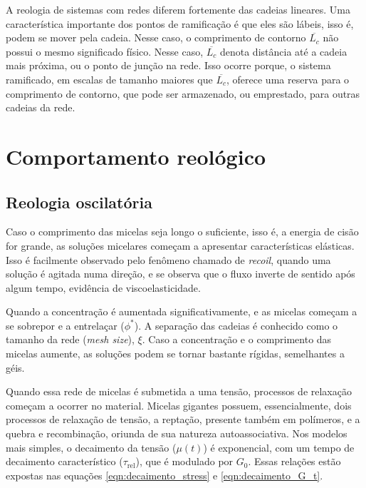 		A reologia de sistemas com redes diferem fortemente das cadeias lineares. %
		Uma característica importante dos pontos de ramificação é que eles são lábeis, isso é, podem se mover pela cadeia. Nesse caso, o comprimento de contorno \(\overline{L_c}\) não possui o mesmo significado físico. Nesse caso, \(\overline{L_c}\) denota distância até a cadeia mais próxima, ou o ponto de junção na rede. Isso ocorre porque, o sistema ramificado, em escalas de tamanho maiores que \(\overline{L_c}\), oferece uma reserva para o comprimento de contorno, que pode ser armazenado, ou emprestado, para outras cadeias da rede. %
		
		\section{Comportamento reológico}
		
		\subsection{Reologia oscilatória} 
		\label{sec:teo_reologia_oscilatoria}
		Caso o comprimento das micelas seja longo o suficiente, isso é, a energia de cisão for grande, as soluções micelares começam a apresentar características elásticas. Isso é facilmente observado pelo fenômeno chamado de \emph{recoil}, quando uma solução é agitada numa direção, e se observa que o fluxo inverte de sentido após algum tempo, evidência de viscoelasticidade. 
		
		Quando a concentração é aumentada significativamente, e as micelas começam a se sobrepor e a entrelaçar (\(\phi^*\)). A separação das cadeias é conhecido como o tamanho da rede (\emph{mesh size}), \(\xi\). Caso a concentração e o comprimento das micelas aumente, as soluções podem se tornar bastante rígidas, semelhantes a géis. 

		Quando essa rede de micelas é submetida a uma tensão, processos de relaxação começam a ocorrer no material. Micelas gigantes possuem, essencialmente, dois processos de relaxação de tensão, a reptação, presente também em polímeros, e a quebra e recombinação, oriunda de sua natureza autoassociativa. Nos modelos mais simples, o decaimento da tensão (\(\mu(t)\)) é exponencial, com um tempo de decaimento característico (\(\tau_{\mathrm{rel}}\)), que é modulado por \(G_0\). Essas relações estão expostas nas equações \ref{eqn:decaimento_stress} e \ref{eqn:decaimento_G_t}. 
		
